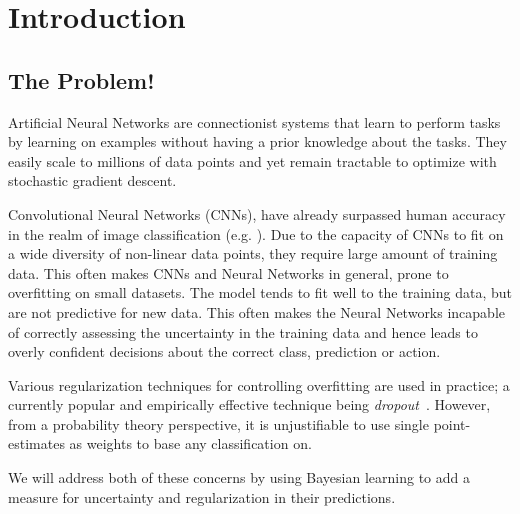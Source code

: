 
\chapter{Introduction}  %

\ifpdf
    \graphicspath{{Chapter1/Figs/Raster/}{Chapter1/Figs/PDF/}{Chapter1/Figs/}}
\else
    \graphicspath{{Chapter1/Figs/Vector/}{Chapter1/Figs/}}
\fi



\section{The Problem!}

Artificial Neural Networks are connectionist systems that learn to perform tasks by learning on examples without having a prior knowledge about the tasks. 
They easily scale to millions of data points and yet remain tractable to optimize with stochastic gradient descent.

Convolutional Neural Networks (CNNs), have already surpassed human accuracy in the realm of image classification (e.g. \cite{he2016deep,simonyan2014very,krizhevsky2012imagenet}). Due to the capacity of CNNs to fit on a wide diversity of non-linear data points, they require large amount of training data. This often makes CNNs and Neural Networks in general, prone to overfitting on small datasets. The model tends to fit well to the training data, but are not predictive for new data. This often makes the Neural Networks incapable of correctly assessing the uncertainty in the training data and hence leads to overly confident decisions about the correct class, prediction or action.

Various regularization techniques for controlling overfitting are used in practice; a currently popular and empirically effective technique being \emph{dropout}~\cite{hinton2012improving}. However, from a probability theory perspective, it is unjustifiable to use single point-estimates as weights to base any classification on. 

We will address both of these concerns by using Bayesian learning to add a measure for uncertainty and regularization in their predictions. 

